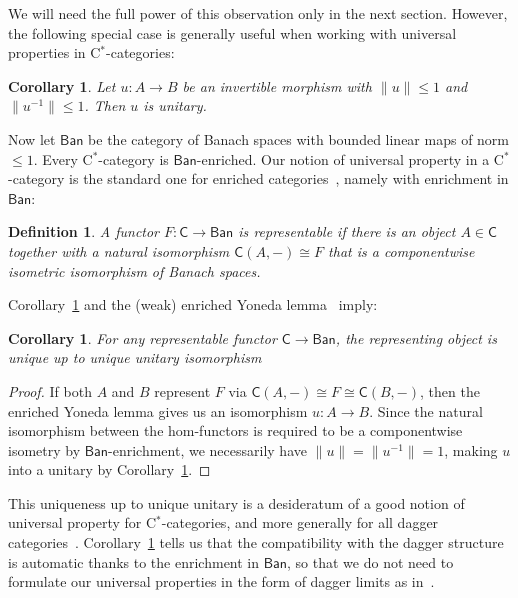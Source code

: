 \documentclass[reqno,T1,11pt]{amsproc}
\newcommand{\cat}[1]{\mathsf{#1}}		%
\newcommand{\Ban}{\mathsf{Ban}}			%
\theoremstyle{plain}
\newtheorem{cor}[thm]{Corollary}
\newtheorem{defn}[thm]{Definition}
\theoremstyle{remark}
\numberwithin{equation}{section}
\begin{document}
We will need the full power of this observation only in the next section. However, the following special case is generally useful when working with universal properties in C$^*$-categories:

\begin{cor}
Let $u : A \to B$ be an invertible morphism with $\| u \| \leq 1$ and $\| u^{-1} \| \leq 1$. Then $u$ is unitary.
\label{unitaries}
\end{cor}

Now let $\Ban$ be the category of Banach spaces with bounded linear maps of norm $\leq 1$. Every C$^*$-category is $\Ban$-enriched. Our notion of universal property in a C$^*$-category is the standard one for enriched categories~\cite[Section~1.10]{kelly}, namely with enrichment in $\Ban$:

\begin{defn}
\label{def_univ}
A functor $F : \cat{C} \to \Ban$ is \emph{representable} if there is an object $A \in \cat{C}$ together with a natural isomorphism $\cat{C}(A,-)\cong F$ that is a componentwise isometric isomorphism of Banach spaces.
\end{defn}

Corollary~\ref{unitaries} and the (weak) enriched Yoneda lemma~\cite[Section~1.9]{kelly} imply:

\begin{cor}
\label{unique_up_to_unitary}
For any representable functor $\cat{C} \to \Ban$, the representing object is unique up to unique \emph{unitary} isomorphism
\end{cor}

\begin{proof}
	If both $A$ and $B$ represent $F$ via $\cat{C}(A,-)\cong F\cong \cat{C}(B,-)$, then the enriched Yoneda lemma gives us an isomorphism $u : A \to B$. Since the natural isomorphism between the hom-functors is required to be a componentwise isometry by $\Ban$-enrichment, we necessarily have $\| u \| = \| u^{-1} \| = 1$, making $u$ into a unitary by Corollary~\ref{unitaries}.
\end{proof}

This uniqueness up to unique unitary is a desideratum of a good notion of universal property for C$^*$-categories, and more generally for all dagger categories~\cite{daglims}. Corollary~\ref{unitaries} tells us that the compatibility with the dagger structure is automatic thanks to the enrichment in $\Ban$, so that we do not need to formulate our universal properties in the form of dagger limits as in~\cite{daglims}.
\end{document}
